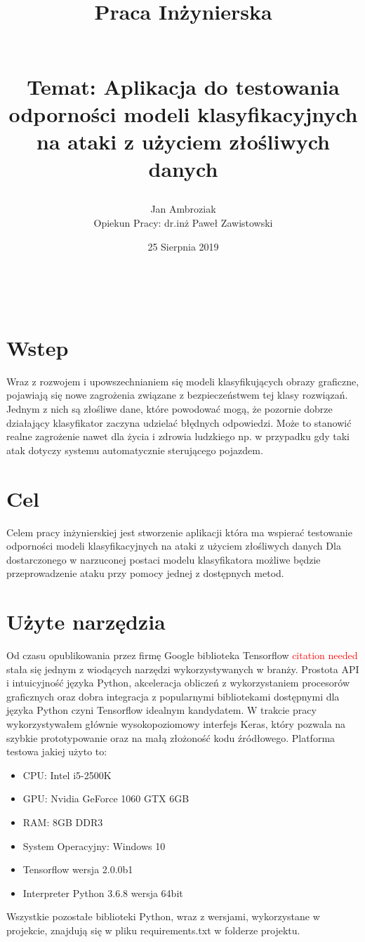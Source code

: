 \documentclass{article}
\title{
Praca Inżynierska
\begin{large}
\\Temat: Aplikacja do testowania odporności
modeli klasyfikacyjnych na ataki z użyciem złośliwych danych
\end{large}}
\date{25 Sierpnia 2019}
\author{Jan Ambroziak \\ Opiekun Pracy: dr.inż Paweł Zawistowski}
\newcommand\todo[1]{\textcolor{red}{#1}}
\begin{document}
\maketitle

\

\section{Wstep}
Wraz z rozwojem i upowszechnianiem się modeli klasyfikujących obrazy graficzne,
pojawiają się nowe zagrożenia związane z bezpieczeństwem tej klasy rozwiązań.
Jednym z nich są złośliwe dane, które powodować mogą,
że pozornie dobrze działający klasyfikator zaczyna udzielać błędnych odpowiedzi.
Może to stanowić realne zagrożenie nawet dla życia i zdrowia ludzkiego
np. w przypadku gdy taki atak dotyczy systemu automatycznie sterującego pojazdem.

\section{Cel}
\label{sec:target}
Celem pracy inżynierskiej jest stworzenie aplikacji która ma wspierać testowanie
odporności modeli klasyfikacyjnych na ataki z użyciem złośliwych danych
Dla dostarczonego w narzuconej postaci modelu klasyfikatora możliwe będzie
przeprowadzenie ataku przy pomocy jednej z dostępnych metod.

\section{Użyte narzędzia}
Od czasu opublikowania przez firmę Google biblioteka Tensorflow \todo{citation needed}
stała się jednym z wiodących narzędzi wykorzystywanych w branży. Prostota API i intuicyjność
języka Python, akceleracja obliczeń z wykorzystaniem procesorów graficznych oraz dobra integracja z
popularnymi bibliotekami dostępnymi dla języka Python czyni Tensorflow idealnym kandydatem.
W trakcie pracy wykorzystywałem głównie wysokopoziomowy interfejs Keras, który pozwala na szybkie
prototypowanie oraz na małą złożoność kodu źródłowego.
Platforma testowa jakiej użyto to:
\begin{itemize}
    \item CPU: Intel i5-2500K
    \item GPU: Nvidia GeForce 1060 GTX 6GB
    \item RAM: 8GB DDR3
    \item System Operacyjny: Windows 10
    \item Tensorflow wersja 2.0.0b1
    \item Interpreter Python 3.6.8 wersja 64bit
\end{itemize}
Wszystkie pozostałe biblioteki Python, wraz z wersjami, wykorzystane w projekcie, znajdują się w pliku
requirements.txt w folderze projektu.
\end{document}
